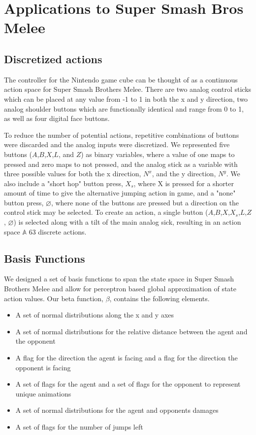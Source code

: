 \section{Applications to Super Smash Bros Melee}

\subsection{Discretized actions}
The controller for the Nintendo game cube can be thought of as a continuous action space for Super Smash Brothers Melee. There are two analog control sticks which can be placed at any value from -1 to 1 in both the x and y direction, two analog shoulder buttons which are functionally identical and range from 0 to 1, as well as four digital face buttons. 

To reduce the number of potential actions, repetitive combinations of buttons were discarded and the analog inputs were discretized. We represented five buttons ($A$,$B$,$X$,$L$, and $Z$) as binary variables, where a value of one maps to pressed and zero maps to not pressed, and the analog stick as a variable with three possible values for both the x direction, $N^{x}$, and the y direction, $N^{y}$. We also include a "short hop" button press, $X_{s}$, where X is pressed for a shorter amount of time to give the alternative jumping action in game, and a "none" button press, $\varnothing$, where none of the buttons are pressed but a direction on the control stick may be selected. To create an action, a single button ($A$,$B$,$X$,$X_{s}$,$L$,$Z$, $\varnothing$) is selected along with a tilt of the main analog sick, resulting in an action space $\mathbb{A}$ 63 discrete actions.

\subsection{Basis Functions}
We designed a set of basis functions to span the state space in Super Smash Brothers Melee and allow for perceptron based global approximation of state action values. Our beta function, $\beta$, contains the following elements.

\begin{itemize}
\item A set of normal distributions along the x and y axes
\item A set of normal distributions for the relative distance between the agent and the opponent
\item A flag for the direction the agent is facing and a flag for the direction the opponent is facing
\item A set of flags for the agent and a set of flags for the opponent to represent unique animations
\item A set of normal distributions for the agent and opponents damages
\item A set of flags for the number of jumps left
\end{itemize}

